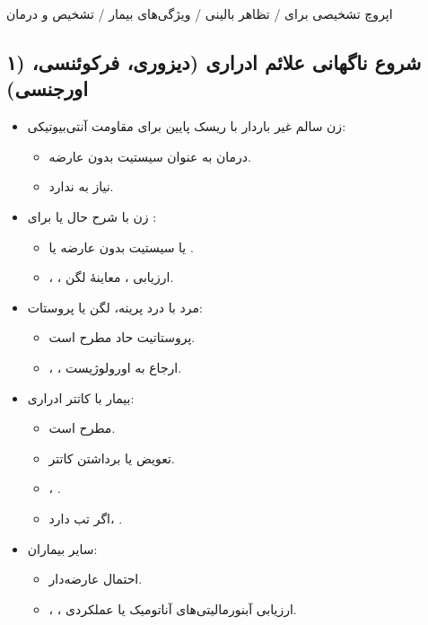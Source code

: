 اپروچ تشخیصی برای  / تظاهر بالینی / ویژگی‌های بیمار / تشخیص و درمان

\subsection*{۱) شروع ناگهانی علائم ادراری (دیزوری، فرکوئنسی، اورجنسی)}
\begin{itemize}
\item زن سالم غیر باردار با ریسک پایین برای مقاومت آنتی‌بیوتیکی:
\begin{itemize}
\item درمان به عنوان سیستیت بدون عارضه.
\item نیاز به  ندارد.
\end{itemize}
\item زن با شرح حال یا  برای :
\begin{itemize}
\item یا سیستیت بدون عارضه یا .
\item {}، ، ارزیابی ، معاینهٔ لگن.
\end{itemize}
\item مرد با درد پرینه، لگن یا پروستات:
\begin{itemize}
\item پروستاتیت حاد مطرح است.
\item {}، ، ارجاع به اورولوژیست.
\end{itemize}
\item بیمار با کاتتر ادراری:
\begin{itemize}
\item {} مطرح است.
\item تعویض یا برداشتن کاتتر.
\item {}، .
\item اگر تب دارد، .
\end{itemize}
\item سایر بیماران:
\begin{itemize}
\item احتمال  عارضه‌دار.
\item {}، ، ارزیابی آبنورمالیتی‌های آناتومیک یا عملکردی.
\end{itemize}
\end{itemize}

